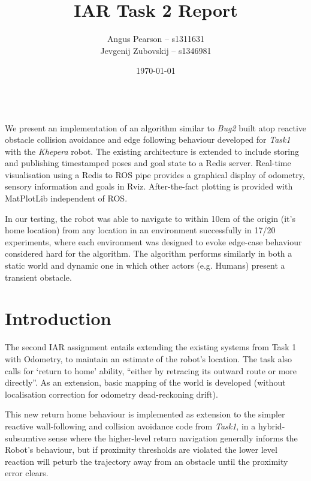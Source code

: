 \documentclass[11pt, a4paper]{article}
\renewenvironment{abstract}{%
{\mdseries\scshape\Large\abstractname}
\vspace{1em}\\
}{\par\noindent}
\begin{document}
\title{IAR Task 2 Report}
\author{Angus Pearson -- s1311631\\ Jevgenij Zubovskij -- s1346981}
\date{\today}
\maketitle



\begin{abstract}
  We present an implementation of an algorithm similar to \textit{Bug2} \cite{principlesrobot} 
  built atop reactive obstacle collision avoidance and edge following behaviour developed for 
  \textit{Task1} with the \textit{Khepera} robot. The existing architecture is extended to
  include storing and publishing timestamped poses and goal state to a Redis \cite{Redis} server.
  Real-time visualisation using a Redis to ROS \cite{ROS} pipe provides a graphical display 
  of odometry, sensory information and goals in Rviz. After-the-fact plotting is provided 
  with MatPlotLib independent of ROS.

  In our testing, the robot was able to navigate to within 10cm of the origin (it's home location) 
  from any location in an environment successfully in 17/20 experiments, where each 
  environment was designed to evoke edge-case behaviour considered hard for the algorithm. The 
  algorithm performs similarly in both a static world and dynamic one in which other actors 
  (e.g. Humans) present a transient obstacle. 
\end{abstract}



\section{Introduction}
\label{Introduction}

The second IAR assignment entails extending the existing systems from Task 1 with Odometry, 
to maintain an estimate of the robot's location. The task also calls for `return to home' ability, 
``either by retracing its outward route or more directly''. As an extension, basic mapping 
of the world is developed (without localisation correction for odometry dead-reckoning drift). 

This new return home behaviour is implemented as extension to the simpler reactive wall-following
and collision avoidance code from \textit{Task1}\cite{task1_report}, in a hybrid-subsumtive sense 
where the higher-level return navigation generally informs the Robot's behaviour, but if proximity
thresholds are violated the lower level reaction will peturb the trajectory away from an obstacle
until the proximity error clears.
\end{document}
